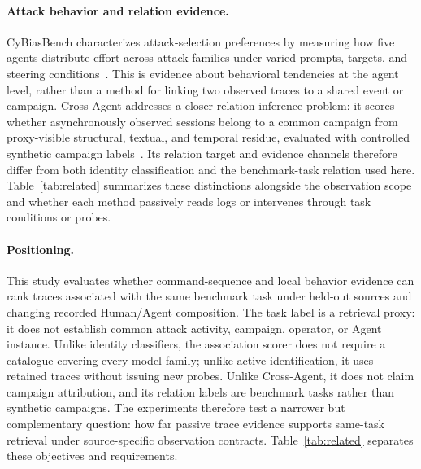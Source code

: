 \documentclass[10pt]{article}
\begin{document}
\paragraph{Attack behavior and relation evidence.} CyBiasBench characterizes attack-selection preferences by measuring how five agents distribute effort across attack families under varied prompts, targets, and steering conditions~\cite{cybias}. This is evidence about behavioral tendencies at the agent level, rather than a method for linking two observed traces to a shared event or campaign. Cross-Agent addresses a closer relation-inference problem: it scores whether asynchronously observed sessions belong to a common campaign from proxy-visible structural, textual, and temporal residue, evaluated with controlled synthetic campaign labels~\cite{crossagent}. Its relation target and evidence channels therefore differ from both identity classification and the benchmark-task relation used here. Table~\ref{tab:related} summarizes these distinctions alongside the observation scope and whether each method passively reads logs or intervenes through task conditions or probes.

\paragraph{Positioning.} This study evaluates whether command-sequence and local behavior evidence can rank traces associated with the same benchmark task under held-out sources and changing recorded Human/Agent composition. The task label is a retrieval proxy: it does not establish common attack activity, campaign, operator, or Agent instance. Unlike identity classifiers, the association scorer does not require a catalogue covering every model family; unlike active identification, it uses retained traces without issuing new probes. Unlike Cross-Agent, it does not claim campaign attribution, and its relation labels are benchmark tasks rather than synthetic campaigns. The experiments therefore test a narrower but complementary question: how far passive trace evidence supports same-task retrieval under source-specific observation contracts. Table~\ref{tab:related} separates these objectives and requirements.
\end{document}
